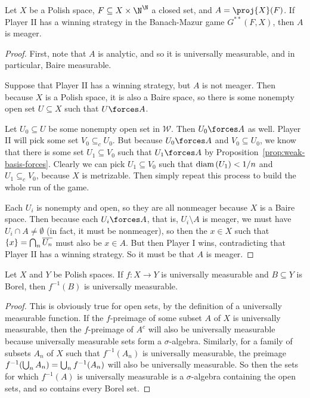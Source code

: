 \documentclass[10pt]{article}
\begin{document}
\begin{proposition}[Exercise 79]
    Let $X$ be a Polish space, $F \subseteq X \times \N^{\N}$ a closed set, and $A = \proj{X}(F)$.
        If Player II has a winning strategy in the Banach-Mazur game $G^{**}(F,X)$, then $A$ is meager.
\end{proposition}
\begin{proof}
    First, note that $A$ is analytic, and so it is universally measurable, and in particular, Baire measurable.

    Suppose that Player II has a winning strategy, but $A$ is not meager.
    Then because $X$ is a Polish space, it is also a Baire space, so there is some nonempty open set $U \subseteq X$ such that $U \forces A$.

    Let $U_0 \subseteq U$ be some nonempty open set in $\mathcal{W}$.
    Then $U_0 \forces A$ as well.
    Player II will pick some set $V_0 \subseteq_c U_0$.
    But because $U_0 \forces A$ and $V_0 \subseteq U_0$, we know that there is some set $U_1 \subseteq V_0$ such that $U_1 \forces A$ by Proposition~\ref{prop:weak-basis-forces}.
    Clearly we can pick $U_1 \subseteq V_0$ such that $\text{diam} \left( U_1 \right) < 1/n$ and $U_1 \subseteq_c V_0$, because $X$ is metrizable.
    Then simply repeat this process to build the whole run of the game.

    Each $U_i$ is nonempty and open, so they are all nonmeager because $X$ is a Baire space.
    Then because each $U_i \forces A$, that is, $U_i \setminus A$ is meager, we must have $U_i \cap A \neq \emptyset$ (in fact, it must be nonmeager), so then the $x \in X$ such that ${\left\{ {x} \right\}} = \bigcap_n \overline{U_n}$ must also be $x \in A$.
    But then Player I wins, contradicting that Player II has a winning strategy.
    So it must be that $A$ is meager.
\end{proof}

\begin{lemma}
    Let $X$ and $Y$ be Polish spaces.
    If $f : X \to Y$ is universally measurable and $B \subseteq Y$ is Borel, then $f^{-1}(B)$ is universally measurable.
\end{lemma}
\begin{proof}
    This is obviously true for open sets, by the definition of a universally measurable function.
    If the $f$-preimage of some subset $A$ of $X$ is universally measurable, then the $f$-preimage of $A^c$ will also be universally measurable because universally measurable sets form a $\sigma$-algebra.
    Similarly, for a family of subsets $A_n$ of $X$ such that $f^{-1}(A_n)$ is universally measurable, the preimage $f^{-1}{\left( {\bigcup_n A_n} \right)} = \bigcup_n f^{-1}(A_n)$ will also be universally measurable.
    So then the sets for which $f^{-1}(A)$ is universally measurable is a $\sigma$-algebra containing the open sets, and so contains every Borel set.
\end{proof}
\end{document}
